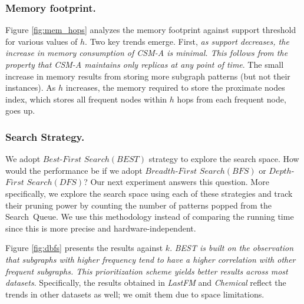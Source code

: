 

\vspace{-0.1in}
\subsubsection{Memory footprint.} Figure \ref{fig:mem_hops} analyzes the memory footprint against support threshold for various values of $h$. Two key trends emerge. First, {\em as support decreases, the increase in memory consumption of CSM-A is minimal. This follows from the property that CSM-A maintains only replicas at any point of time}. The small increase in memory results from storing more subgraph patterns (but not their instances). As $h$ increases, the memory required to store the proximate nodes index, which stores all frequent nodes within $h$ hops from each frequent node, goes up.

\vspace{-0.1in}
\subsubsection{Search Strategy.} We adopt  $Best$-$First$ $Search (BEST)$ strategy to explore the search space. How would the performance be if we adopt $Breadth$-$First$ $Search (BFS)$ or $Depth$-$First$ $Search (DFS)$? Our next experiment answers this question. More specifically, we explore the search space using each of these strategies and track their pruning power by counting the number of patterns popped from the {\sf Search\ Queue}. We use this methodology instead of comparing the running time since this is more precise and hardware-independent.

Figure \ref{fig:dbfs} presents the results against $k$. {\em BEST is built on the observation that subgraphs with higher frequency tend to have a higher correlation with other frequent subgraphs. This prioritization scheme yields better results across most datasets}. Specifically, the results obtained in {\em LastFM}  and {\em Chemical} reflect the trends in other datasets as well; we omit them due to space limitations.

